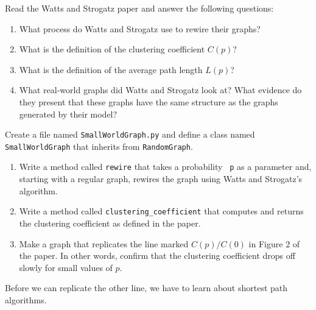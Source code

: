 \documentclass[10pt]{book}
\begin{document}
\begin{ex}

Read the Watts and Strogatz paper and answer the following
questions:

\begin{enumerate}

\item What process do Watts and Strogatz use to rewire their
graphs?

\item What is the definition of the clustering coefficient $C(p)$?

\item What is the definition of the average path length $L(p)$?

\item What real-world graphs did Watts and Strogatz look at?
What evidence do they present that these graphs have the
same structure as the graphs generated by their model?

\end{enumerate}

\end{ex}  


\begin{ex}

Create a file named {\tt SmallWorldGraph.py} and define a class named 
{\tt SmallWorldGraph} that inherits from {\tt RandomGraph}.

\begin{enumerate}

\item Write a method called {\tt rewire} that takes a probability {\tt
  p} as a parameter and, starting with a regular graph, rewires
the graph using Watts and Strogatz's algorithm.

\item Write a method called \verb"clustering_coefficient" that
computes and returns the clustering coefficient as defined in the
paper.

\item Make a graph that replicates the line marked $C(p)/C(0)$ in
Figure 2 of the paper.  In other words, 
confirm that the clustering coefficient drops off slowly for
small values of $p$.

\end{enumerate}

Before we can replicate the other line, we have to learn about shortest
path algorithms.

\end{ex}
\end{document}
